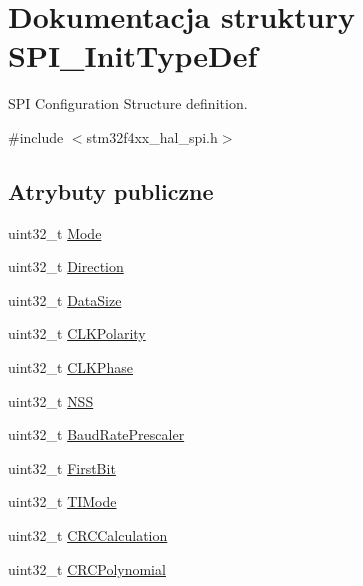 \hypertarget{struct_s_p_i___init_type_def}{}\section{Dokumentacja struktury S\+P\+I\+\_\+\+Init\+Type\+Def}
\label{struct_s_p_i___init_type_def}


S\+PI Configuration Structure definition.  




{\ttfamily \#include $<$stm32f4xx\+\_\+hal\+\_\+spi.\+h$>$}

\subsection*{Atrybuty publiczne}
\begin{DoxyCompactItemize}
\item 
uint32\+\_\+t \hyperlink{struct_s_p_i___init_type_def_a5247eb0463437c9980a9d4a5300b50a5}{Mode}
\item 
uint32\+\_\+t \hyperlink{struct_s_p_i___init_type_def_ae5c132f597c806d7a1fe316023b36867}{Direction}
\item 
uint32\+\_\+t \hyperlink{struct_s_p_i___init_type_def_a24b7835dd877e1c4e55236303fa3387f}{Data\+Size}
\item 
uint32\+\_\+t \hyperlink{struct_s_p_i___init_type_def_a96922c7ff9e589ebd9611fc4ab730454}{C\+L\+K\+Polarity}
\item 
uint32\+\_\+t \hyperlink{struct_s_p_i___init_type_def_ab21a458209f2588f49a2353c56f62625}{C\+L\+K\+Phase}
\item 
uint32\+\_\+t \hyperlink{struct_s_p_i___init_type_def_aed541d17808213ac6f90ac7deb2bec5f}{N\+SS}
\item 
uint32\+\_\+t \hyperlink{struct_s_p_i___init_type_def_a1d553f90738cb633a9298d2b4d306fde}{Baud\+Rate\+Prescaler}
\item 
uint32\+\_\+t \hyperlink{struct_s_p_i___init_type_def_a8c541d8863cb62a3212b9381b5cba447}{First\+Bit}
\item 
uint32\+\_\+t \hyperlink{struct_s_p_i___init_type_def_a60db7e87bb66775df6213e4006dfd876}{T\+I\+Mode}
\item 
uint32\+\_\+t \hyperlink{struct_s_p_i___init_type_def_a3472de9bd9247c1d97312aff7e58e385}{C\+R\+C\+Calculation}
\item 
uint32\+\_\+t \hyperlink{struct_s_p_i___init_type_def_abdaf3ccbfa4ef68cc81fd32f29baa678}{C\+R\+C\+Polynomial}
\end{DoxyCompactItemize}


